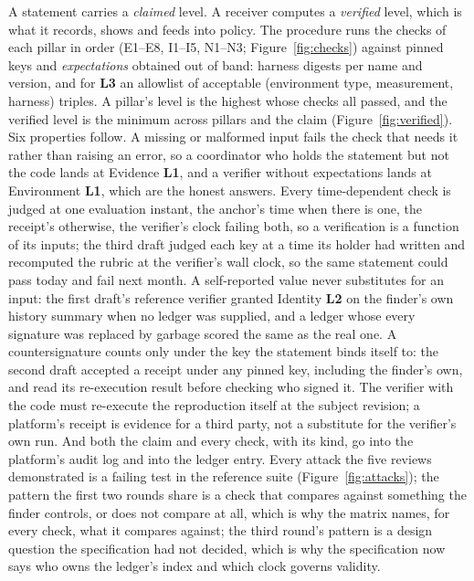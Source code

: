 \documentclass[11pt]{article}
\newcommand{\lvl}[1]{\textbf{L#1}}
\begin{document}
A statement carries a \emph{claimed} level. A receiver computes a \emph{verified} level, which is what it
records, shows and feeds into policy. The procedure runs the checks of each pillar in order (E1--E8, I1--I5,
N1--N3; Figure~\ref{fig:checks}) against pinned keys and \emph{expectations} obtained out of band: harness digests
per name and version, and for \lvl{3} an allowlist of acceptable (environment type, measurement, harness)
triples. A pillar's level is the highest whose checks all passed, and the verified level is the minimum across
pillars and the claim (Figure~\ref{fig:verified}). Six properties follow. A missing or malformed input fails
the check that needs it rather than raising an error, so a coordinator who holds the statement but not the code
lands at Evidence \lvl{1}, and a verifier without expectations lands at Environment \lvl{1}, which are the honest
answers. Every time-dependent check is judged at one evaluation instant, the anchor's time when there is one, the
receipt's otherwise, the verifier's clock failing both, so a verification is a function of its inputs; the third
draft judged each key at a time its holder had written and recomputed the rubric at the verifier's wall clock, so
the same statement could pass today and fail next month. A self-reported value never substitutes for an input: the first draft's reference verifier granted
Identity \lvl{2} on the finder's own history summary when no ledger was supplied, and a ledger whose every
signature was replaced by garbage scored the same as the real one. A countersignature counts only under the key
the statement binds itself to: the second draft accepted a receipt under any pinned key, including the finder's
own, and read its re-execution result before checking who signed it. The verifier with the code must re-execute
the reproduction itself at the subject revision; a platform's receipt is evidence for a third party, not a
substitute for the verifier's own run. And both the claim and every check, with its kind, go into the platform's
audit log and into the ledger entry. Every attack the five reviews demonstrated is a failing test in the
reference suite (Figure~\ref{fig:attacks}); the pattern the first two rounds share is a check that compares against
something the finder controls, or does not compare at all, which is why the matrix names, for every check, what it
compares against; the third round's pattern is a design question the specification had not decided, which is why
the specification now says who owns the ledger's index and which clock governs validity.
\end{document}
